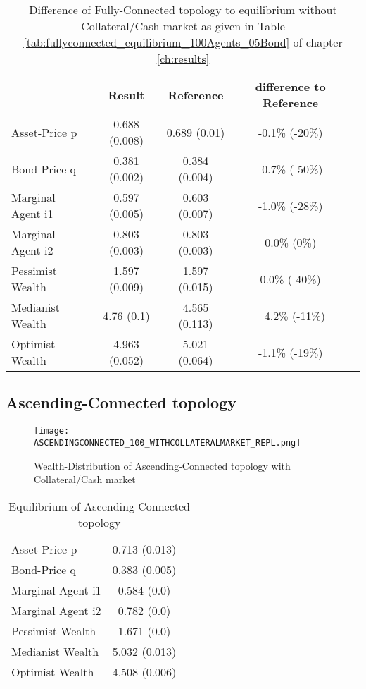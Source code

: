 \documentclass[Bachelorarbeit.tex]{subfiles}
\begin{document}
\begin{table}[H]
	\caption{Difference of Fully-Connected topology to equilibrium without Collateral/Cash market as given in Table \ref{tab:fullyconnected_equilibrium_100Agents_05Bond} of chapter \ref{ch:results}}
	\centering
	\begin{tabular} { l c c c r }
		& Result & Reference & difference to Reference \\
		\hline
		Asset-Price p & 0.688 (0.008) & 0.689 (0.01) & -0.1\% (-20\%) \\
		Bond-Price q & 0.381 (0.002) & 0.384 (0.004) & -0.7\% (-50\%) \\
		Marginal Agent i1 & 0.597 (0.005) & 0.603 (0.007) & -1.0\% (-28\%) \\
		Marginal Agent i2 & 0.803 (0.003) & 0.803 (0.003) & 0.0\% (0\%) \\
		\hline
		Pessimist Wealth & 1.597 (0.009) & 1.597 (0.015) & 0.0\% (-40\%) \\
		Medianist Wealth & 4.76 (0.1) & 4.565 (0.113) & +4.2\% (-11\%) \\
		Optimist Wealth & 4.963 (0.052) & 5.021 (0.064) & -1.1\% (-19\%) \\
		\hline
	\end{tabular}
\end{table} 

\subsection{Ascending-Connected topology}
\begin{figure}[H]
	\centering
  \texttt{[image: ASCENDINGCONNECTED\_100\_WITHCOLLATERALMARKET\_REPL.png]}
	\caption{Wealth-Distribution of Ascending-Connected topology with Collateral/Cash market}
	\label{fig:wealth_ASCENDINGCONNECTED_100_WITHCOLLATERALMARKET_REPL}
\end{figure}

\begin{table}[H]
	\caption{Equilibrium of Ascending-Connected topology}
	\centering
	\begin{tabular} { l c r }
		\hline
		Asset-Price p & 0.713 (0.013) \\
		Bond-Price q & 0.383 (0.005) \\
		Marginal Agent i1 & 0.584 (0.0) \\
		Marginal Agent i2 & 0.782 (0.0) \\
		\hline
		Pessimist Wealth & 1.671 (0.0) \\
		Medianist Wealth & 5.032 (0.013) \\
		Optimist Wealth & 4.508 (0.006) \\
		\hline
	\end{tabular}
\end{table} 
\end{document}
